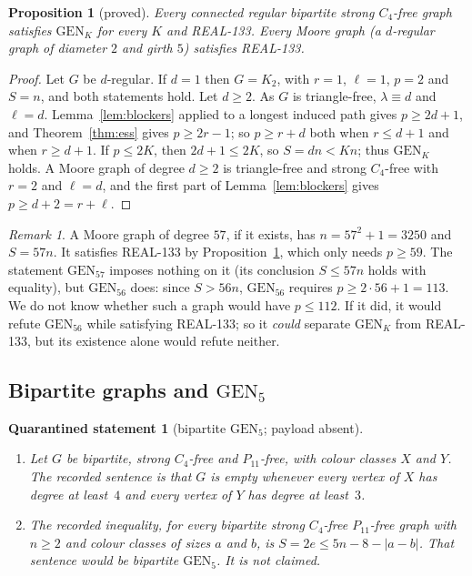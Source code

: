 \documentclass[11pt]{amsart}
\newtheorem{proposition}[theorem]{Proposition}
\newtheorem{qrecord}[theorem]{Quarantined statement}
\theoremstyle{definition}
\theoremstyle{remark}
\newtheorem{remark}[theorem]{Remark}
\newcommand{\lr}{\ell}
\newcommand{\pp}{p}
\newcommand{\GEN}{\mathrm{GEN}}
\begin{document}
\begin{proposition}[proved]\label{prop:regbip}
Every connected regular bipartite strong $C_4$-free graph satisfies $\GEN_K$ for every $K$ and REAL-133. Every Moore graph \textup{(}a $d$-regular graph of diameter $2$ and girth $5$\textup{)} satisfies REAL-133.
\end{proposition}

\begin{proof}
Let $G$ be $d$-regular. If $d=1$ then $G=K_2$, with $r=1$, $\lr=1$, $\pp=2$ and $S=n$, and both statements hold. Let $d\ge2$. As $G$ is triangle-free, $\lambda\equiv d$ and $\lr=d$. Lemma~\ref{lem:blockers} applied to a longest induced path gives $\pp\ge2d+1$, and Theorem~\ref{thm:ess} gives $\pp\ge2r-1$; so $\pp\ge r+d$ both when $r\le d+1$ and when $r\ge d+1$. If $\pp\le2K$, then $2d+1\le2K$, so $S=dn<Kn$; thus $\GEN_K$ holds. A Moore graph of degree $d\ge2$ is triangle-free and strong $C_4$-free with $r=2$ and $\lr=d$, and the first part of Lemma~\ref{lem:blockers} gives $\pp\ge d+2=r+\lr$.
\end{proof}

\begin{remark}\label{rem:moore}
A Moore graph of degree $57$, if it exists, has $n=57^2+1=3250$ and $S=57n$. It satisfies REAL-133 by Proposition~\ref{prop:regbip}, which only needs $\pp\ge59$. The statement $\GEN_{57}$ imposes nothing on it (its conclusion $S\le57n$ holds with equality), but $\GEN_{56}$ does: since $S>56n$, $\GEN_{56}$ requires $\pp\ge2\cdot56+1=113$. We do not know whether such a graph would have $\pp\le112$. If it did, it would refute $\GEN_{56}$ while satisfying REAL-133; so it \emph{could} separate $\GEN_K$ from REAL-133, but its existence alone would refute neither.
\end{remark}

\subsection{Bipartite graphs and \texorpdfstring{$\GEN_5$}{GEN5}}

\begin{qrecord}[bipartite $\GEN_5$; payload absent]\label{thm:bip}
\begin{enumerate}
\item Let $G$ be bipartite, strong $C_4$-free and $P_{11}$-free, with colour classes $X$ and $Y$. The recorded sentence is that $G$ is empty whenever every vertex of $X$ has degree at least~$4$ and every vertex of $Y$ has degree at least~$3$.
\item The recorded inequality, for every bipartite strong $C_4$-free $P_{11}$-free graph with $n\ge2$ and colour classes of sizes $a$ and $b$, is $S=2e\le5n-8-|a-b|$. That sentence would be bipartite $\GEN_5$. It is not claimed.
\end{enumerate}
\end{qrecord}
\end{document}
